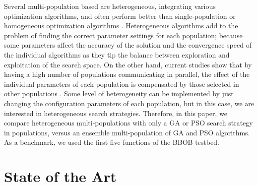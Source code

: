 Several multi-population based are heterogeneous,
integrating various optimization algorithms, and often perform better than
single-population or homogeneous optimization algorithms
\cite{wu2016differential,nseef2016adaptive}. Heterogeneous algorithms add to
the problem of finding the correct parameter settings for each population;
because some parameters affect the accuracy of the solution and the convergence
speed of the individual algorithms as they tip the balance between exploration
and exploitation of the search space. On the other hand, current studies show
that by having a high number of populations communicating in parallel, the
effect of the individual parameters of each population is compensated by those
selected in other populations \cite{li2016multi,tanabe2013evaluation}. Some
level of heterogeneity can be implemented by just changing the configuration
parameters of each population, but in this case, we are interested in
heterogeneous search strategies. Therefore, in this paper, we compare
heterogeneous multi-populations with only a GA or PSO search strategy in
populations, versus an ensemble multi-population of GA and PSO algorithms. As a
benchmark, we used the first five functions of the BBOB testbed.

\section{State of the Art}





